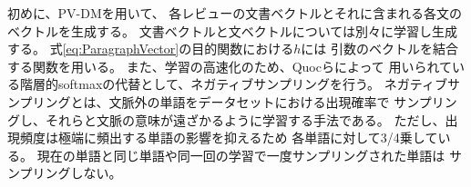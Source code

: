 \documentclass[twocolumn,a4paper]{ltjarticle}
\begin{document}
初めに、PV-DMを用いて、
各レビューの文書ベクトルとそれに含まれる各文のベクトルを生成する。
文書ベクトルと文ベクトルについては別々に学習し生成する。
式\ref{eq:ParagraphVector}の目的関数における$h$には
引数のベクトルを結合する関数を用いる。
また、学習の高速化のため、Quocら\cite{quoc14}によって
用いられている階層的softmaxの代替として、ネガティブサンプリングを行う。
ネガティブサンプリングとは、文脈外の単語をデータセットにおける出現確率で
サンプリングし、それらと文脈の意味が遠ざかるように学習する手法である。
ただし、出現頻度は極端に頻出する単語の影響を抑えるため
各単語に対して3/4乗している。
現在の単語と同じ単語や同一回の学習で一度サンプリングされた単語は
サンプリングしない。
\end{document}
